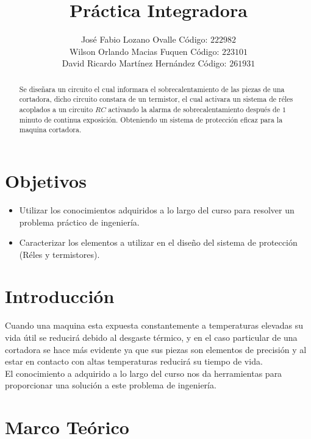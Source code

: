 \documentclass[twocolumn]{IEEEtran}
\begin{document}
\title{Práctica Integradora}
\author{José Fabio Lozano Ovalle Código: $222982$\\
	Wilson Orlando Macias Fuquen Código: $223101$\\
	David Ricardo Martínez Hernández Código: $261931$}
\maketitle
{}
\begin{abstract}
 Se diseñara un circuito el cual informara el sobrecalentamiento de las piezas de una cortadora, dicho circuito constara de un termistor, el cual activara un sistema de réles acoplados a un circuito $RC$ activando la alarma de sobrecalentamiento después de $1$ minuto de continua exposición. Obteniendo un sistema de protección eficaz para la maquina cortadora.
\end{abstract}
\section{Objetivos}
\begin{itemize}
 \item Utilizar los conocimientos adquiridos a lo largo del curso para resolver un problema práctico de ingeniería.
 \item Caracterizar los elementos a utilizar en el diseño del sistema de protección (Réles y termistores).
\end{itemize}

\section{Introducción}
\noindent
Cuando una maquina esta expuesta constantemente a temperaturas elevadas su vida útil se reducirá debido al desgaste térmico, y en el caso particular de una cortadora se hace más evidente ya que sus piezas son elementos de precisión y al estar en contacto con altas temperaturas reducirá su tiempo de vida.\\
El conocimiento a adquirido a lo largo del curso nos da herramientas para proporcionar una solución a este problema de ingeniería.

\section{Marco Teórico}
\end{document}
